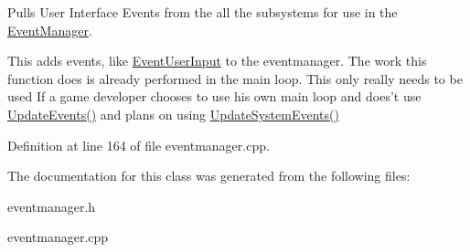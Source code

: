Pulls User Interface Events from the all the subsystems for use in the \hyperlink{classphys_1_1EventManager}{EventManager}. 

This adds events, like \hyperlink{classphys_1_1EventUserInput}{EventUserInput} to the eventmanager. The work this function does is already performed in the main loop. This only really needs to be used If a game developer chooses to use his own main loop and does't use \hyperlink{classphys_1_1EventManager_a63cf23dc9fe0ced3e2c60ca61c97b166}{UpdateEvents()} and plans on using \hyperlink{classphys_1_1EventManager_a0cf574c55def063d66d7db46a4d3e8a5}{UpdateSystemEvents()} 

Definition at line 164 of file eventmanager.cpp.



The documentation for this class was generated from the following files:\begin{DoxyCompactItemize}
\item 
eventmanager.h\item 
eventmanager.cpp\end{DoxyCompactItemize}
